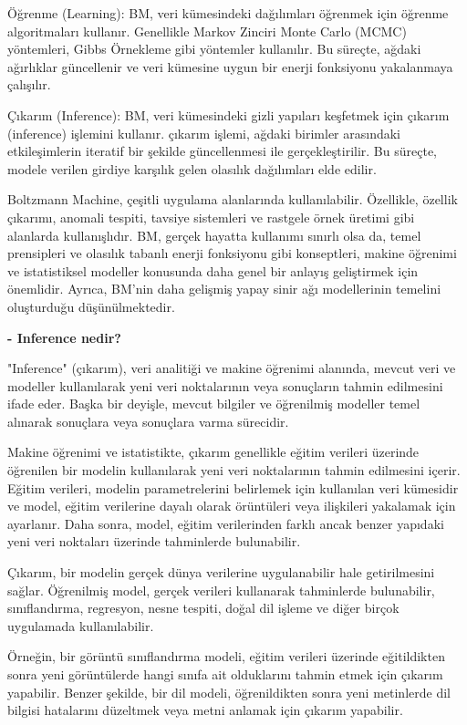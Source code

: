 \documentclass[11pt]{article}
\begin{document}
Öğrenme (Learning): BM, veri kümesindeki dağılımları öğrenmek için öğrenme algoritmaları kullanır. Genellikle Markov Zinciri Monte Carlo (MCMC) yöntemleri, Gibbs Örnekleme gibi yöntemler kullanılır. Bu süreçte, ağdaki ağırlıklar güncellenir ve veri kümesine uygun bir enerji fonksiyonu yakalanmaya çalışılır.

Çıkarım (Inference): BM, veri kümesindeki gizli yapıları keşfetmek için çıkarım (inference) işlemini kullanır. çıkarım işlemi, ağdaki birimler arasındaki etkileşimlerin iteratif bir şekilde güncellenmesi ile gerçekleştirilir. Bu süreçte, modele verilen girdiye karşılık gelen olasılık dağılımları elde edilir.

Boltzmann Machine, çeşitli uygulama alanlarında kullanılabilir. Özellikle, özellik çıkarımı, anomali tespiti, tavsiye sistemleri ve rastgele örnek üretimi gibi alanlarda kullanışlıdır. BM, gerçek hayatta kullanımı sınırlı olsa da, temel prensipleri ve olasılık tabanlı enerji fonksiyonu gibi konseptleri, makine öğrenimi ve istatistiksel modeller konusunda daha genel bir anlayış geliştirmek için önemlidir. Ayrıca, BM'nin daha gelişmiş yapay sinir ağı modellerinin temelini oluşturduğu düşünülmektedir.

\textbf{- Inference nedir?}

"Inference" (çıkarım), veri analitiği ve makine öğrenimi alanında, mevcut veri ve modeller kullanılarak yeni veri noktalarının veya sonuçların tahmin edilmesini ifade eder. Başka bir deyişle, mevcut bilgiler ve öğrenilmiş modeller temel alınarak sonuçlara veya sonuçlara varma sürecidir.

Makine öğrenimi ve istatistikte, çıkarım genellikle eğitim verileri üzerinde öğrenilen bir modelin kullanılarak yeni veri noktalarının tahmin edilmesini içerir. Eğitim verileri, modelin parametrelerini belirlemek için kullanılan veri kümesidir ve model, eğitim verilerine dayalı olarak örüntüleri veya ilişkileri yakalamak için ayarlanır. Daha sonra, model, eğitim verilerinden farklı ancak benzer yapıdaki yeni veri noktaları üzerinde tahminlerde bulunabilir.

Çıkarım, bir modelin gerçek dünya verilerine uygulanabilir hale getirilmesini sağlar. Öğrenilmiş model, gerçek verileri kullanarak tahminlerde bulunabilir, sınıflandırma, regresyon, nesne tespiti, doğal dil işleme ve diğer birçok uygulamada kullanılabilir.

Örneğin, bir görüntü sınıflandırma modeli, eğitim verileri üzerinde eğitildikten sonra yeni görüntülerde hangi sınıfa ait olduklarını tahmin etmek için çıkarım yapabilir. Benzer şekilde, bir dil modeli, öğrenildikten sonra yeni metinlerde dil bilgisi hatalarını düzeltmek veya metni anlamak için çıkarım yapabilir.
\end{document}
